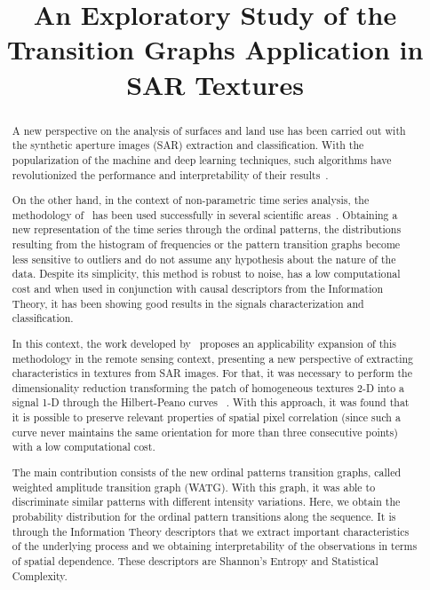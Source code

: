 \documentclass{article}
\title{\textbf{An Exploratory Study of the Transition Graphs Application in SAR Textures}}
\begin{document}
	\maketitle
	
	\begin{abstract}
		
		A new perspective on the analysis of surfaces and land use has been carried out with the synthetic aperture images (SAR) extraction and classification.
		With the popularization of the machine and deep learning techniques, such algorithms have revolutionized the performance and interpretability of their results~\cite{han2020unsupervised, huang2020classification, xie2020polsar}.
		
		On the other hand, in the context of non-parametric time series analysis, the methodology of~\citet{PermutationEntropyBandtPompe} has been used successfully in several scientific areas~\cite{baravalle2018discriminating, Araujo2019permutation, ClassificationVerificationOnlineHandwrittenSignatures}.
		Obtaining a new representation of the time series through the ordinal patterns, the distributions resulting from the histogram of frequencies or the pattern transition graphs become less sensitive to outliers and do not assume any hypothesis about the nature of the data.
		Despite its simplicity, this method is robust to noise, has a low computational cost and when used in conjunction with causal descriptors from the Information Theory, it has been showing good results in the signals characterization and classification.
		
		In this context, the work developed by~\citet{ChagasClassification2020} proposes an applicability expansion of this methodology in the remote sensing context, presenting a new perspective of extracting characteristics in textures from SAR images.
		For that, it was necessary to perform the dimensionality reduction transforming the patch of homogeneous textures \mbox{2-D} into a signal \mbox{1-D} through the Hilbert-Peano curves~\cite{Lee1994Texture} .
		With this approach, it was found that it is possible to preserve relevant properties of spatial pixel correlation (since such a curve never maintains the same orientation for more than three consecutive points) with a low computational cost.
		
		The main contribution consists of the new ordinal patterns transition graphs, called weighted amplitude transition graph (WATG).
		With this graph, it was able to discriminate similar patterns with different intensity variations.
		Here, we obtain the probability distribution for the ordinal pattern transitions along the sequence.
		It is through the  Information Theory descriptors that we extract important characteristics of the underlying process and we obtaining interpretability of the observations in terms of spatial dependence.
		These descriptors are Shannon's Entropy and Statistical Complexity.
		

\end{abstract}
\end{document}
